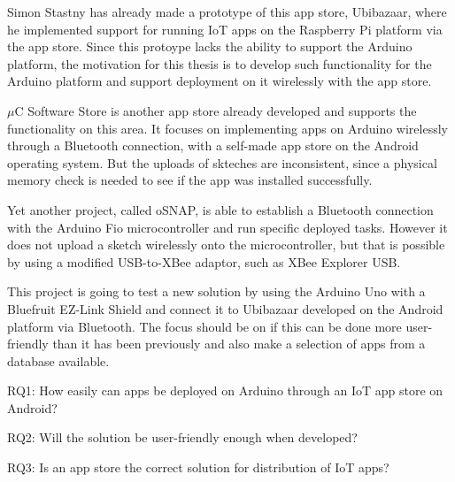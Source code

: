 Simon Stastny has already made a prototype of this app store, Ubibazaar\cite{ubibazaar}, where he implemented support for running IoT apps on the Raspberry Pi platform via the app store. Since this protoype lacks the ability to support the Arduino platform, the motivation for this thesis is to develop such functionality for the Arduino platform and support deployment on it wirelessly with the app store.

\(\mu\)C Software Store\cite{mucstore} is another app store already developed and supports the functionality on this area. It focuses on implementing apps on Arduino wirelessly through a Bluetooth connection, with a self-made app store on the Android operating system. But the uploads of skteches are inconsistent, since a physical memory check is needed to see if the app was installed successfully.

Yet another project, called oSNAP\cite{osnap}, is able to establish a Bluetooth connection with the Arduino Fio microcontroller and run specific deployed tasks. However it does not upload a sketch wirelessly onto the microcontroller, but that is possible by using a modified USB-to-XBee adaptor, such as XBee Explorer USB.\cite{arduinofio} 

This project is going to test a new solution by using the Arduino Uno with a Bluefruit EZ-Link Shield\cite{shield} and connect it to Ubibazaar developed on the Android platform via Bluetooth. The focus should be on if this can be done more user-friendly than it has been previously and also make a selection of apps from a database available.

RQ1: How easily can apps be deployed on Arduino through an IoT app store on Android?

RQ2: Will the solution be user-friendly enough when developed?

RQ3: Is an app store the correct solution for distribution of IoT apps?